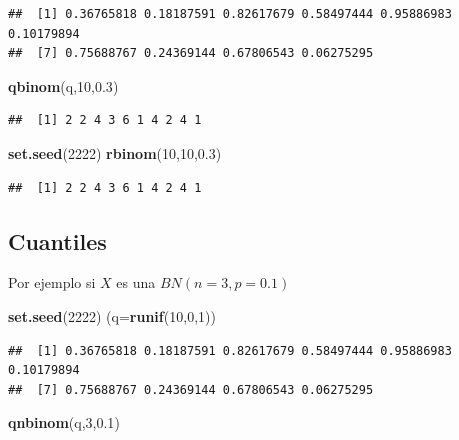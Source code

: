 \documentclass[]{book}
\newenvironment{Shaded}{\begin{snugshade}}{\end{snugshade}}
\newcommand{\DataTypeTok}[1]{\textcolor[rgb]{0.13,0.29,0.53}{#1}}
\newcommand{\DecValTok}[1]{\textcolor[rgb]{0.00,0.00,0.81}{#1}}
\newcommand{\FloatTok}[1]{\textcolor[rgb]{0.00,0.00,0.81}{#1}}
\newcommand{\KeywordTok}[1]{\textcolor[rgb]{0.13,0.29,0.53}{\textbf{#1}}}
\newcommand{\NormalTok}[1]{#1}
\begin{document}
\begin{verbatim}
##  [1] 0.36765818 0.18187591 0.82617679 0.58497444 0.95886983 0.10179894
##  [7] 0.75688767 0.24369144 0.67806543 0.06275295
\end{verbatim}

\begin{Shaded}
\begin{Highlighting}[]
\KeywordTok{qbinom}\NormalTok{(q,}\DecValTok{10}\NormalTok{,}\FloatTok{0.3}\NormalTok{)}
\end{Highlighting}
\end{Shaded}

\begin{verbatim}
##  [1] 2 2 4 3 6 1 4 2 4 1
\end{verbatim}

\begin{Shaded}
\begin{Highlighting}[]
\KeywordTok{set.seed}\NormalTok{(}\DecValTok{2222}\NormalTok{)}
\KeywordTok{rbinom}\NormalTok{(}\DecValTok{10}\NormalTok{,}\DecValTok{10}\NormalTok{,}\FloatTok{0.3}\NormalTok{)}
\end{Highlighting}
\end{Shaded}

\begin{verbatim}
##  [1] 2 2 4 3 6 1 4 2 4 1
\end{verbatim}

\hypertarget{cuantiles-10}{%
\subsection{Cuantiles}\label{cuantiles-10}}

Por ejemplo si \(X\) es una \(BN(n=3,p=0.1)\)

\begin{Shaded}
\begin{Highlighting}[]
\KeywordTok{set.seed}\NormalTok{(}\DecValTok{2222}\NormalTok{)}
\NormalTok{(}\DataTypeTok{q=}\KeywordTok{runif}\NormalTok{(}\DecValTok{10}\NormalTok{,}\DecValTok{0}\NormalTok{,}\DecValTok{1}\NormalTok{))}
\end{Highlighting}
\end{Shaded}

\begin{verbatim}
##  [1] 0.36765818 0.18187591 0.82617679 0.58497444 0.95886983 0.10179894
##  [7] 0.75688767 0.24369144 0.67806543 0.06275295
\end{verbatim}

\begin{Shaded}
\begin{Highlighting}[]
\KeywordTok{qnbinom}\NormalTok{(q,}\DecValTok{3}\NormalTok{,}\FloatTok{0.1}\NormalTok{)}
\end{Highlighting}
\end{Shaded}
\end{document}
